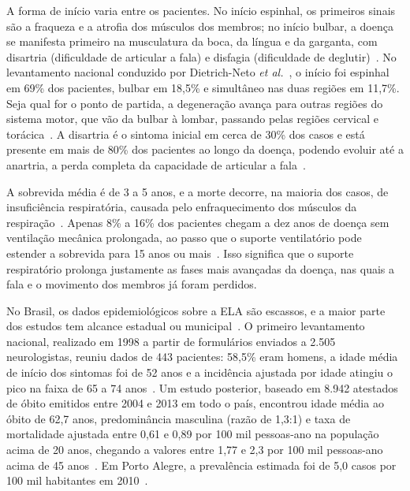 A forma de início varia entre os pacientes. No início espinhal, os primeiros sinais são a fraqueza e a atrofia dos músculos dos membros; no início bulbar, a doença se manifesta primeiro na musculatura da boca, da língua e da garganta, com disartria (dificuldade de articular a fala) e disfagia (dificuldade de deglutir)~\cite{hardiman2017als}. No levantamento nacional conduzido por Dietrich-Neto \textit{et al.}~\cite{dietrichneto2000als}, o início foi espinhal em 69\% dos pacientes, bulbar em 18,5\% e simultâneo nas duas regiões em 11,7\%. Seja qual for o ponto de partida, a degeneração avança para outras regiões do sistema motor, que vão da bulbar à lombar, passando pelas regiões cervical e torácica~\cite{pcdt_ela2020}. A disartria é o sintoma inicial em cerca de 30\% dos casos e está presente em mais de 80\% dos pacientes ao longo da doença, podendo evoluir até a anartria, a perda completa da capacidade de articular a fala~\cite{hardiman2017als}.

A sobrevida média é de 3 a 5 anos, e a morte decorre, na maioria dos casos, de insuficiência respiratória, causada pelo enfraquecimento dos músculos da respiração~\cite{pcdt_ela2020}. Apenas 8\% a 16\% dos pacientes chegam a dez anos de doença sem ventilação mecânica prolongada, ao passo que o suporte ventilatório pode estender a sobrevida para 15 anos ou mais~\cite{pcdt_ela2020}. Isso significa que o suporte respiratório prolonga justamente as fases mais avançadas da doença, nas quais a fala e o movimento dos membros já foram perdidos.

No Brasil, os dados epidemiológicos sobre a \gls{ELA} são escassos, e a maior parte dos estudos tem alcance estadual ou municipal~\cite{barbalho2023als}. O primeiro levantamento nacional, realizado em 1998 a partir de formulários enviados a 2.505 neurologistas, reuniu dados de 443 pacientes: 58,5\% eram homens, a idade média de início dos sintomas foi de 52 anos e a incidência ajustada por idade atingiu o pico na faixa de 65 a 74 anos~\cite{dietrichneto2000als}. Um estudo posterior, baseado em 8.942 atestados de óbito emitidos entre 2004 e 2013 em todo o país, encontrou idade média ao óbito de 62,7 anos, predominância masculina (razão de 1,3:1) e taxa de mortalidade ajustada entre 0,61 e 0,89 por 100 mil pessoas-ano na população acima de 20 anos, chegando a valores entre 1,77 e 2,3 por 100 mil pessoas-ano acima de 45 anos~\cite{moura2016als}. Em Porto Alegre, a prevalência estimada foi de 5,0 casos por 100 mil habitantes em 2010~\cite{linden2013als}.

